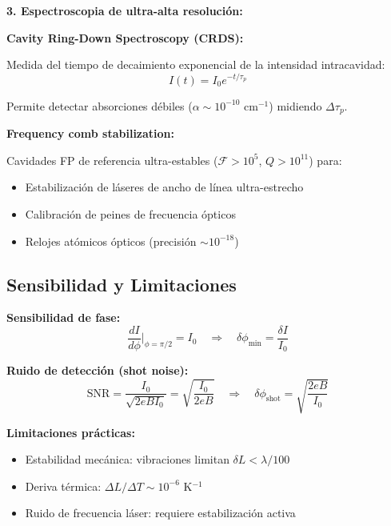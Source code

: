 \documentclass[11pt,a4paper]{article}
\begin{document}
\textbf{3. Espectroscopia de ultra-alta resolución:}

\textbf{Cavity Ring-Down Spectroscopy (CRDS):}

Medida del tiempo de decaimiento exponencial de la intensidad intracavidad:
\begin{equation}
    I(t) = I_0 e^{-t/\tau_p}
\end{equation}

Permite detectar absorciones débiles ($\alpha \sim 10^{-10}$ cm$^{-1}$) midiendo $\Delta\tau_p$.

\textbf{Frequency comb stabilization:}

Cavidades FP de referencia ultra-estables ($\mathcal{F} > 10^5$, $Q > 10^{11}$) para:
\begin{itemize}
    \item Estabilización de láseres de ancho de línea ultra-estrecho
    \item Calibración de peines de frecuencia ópticos
    \item Relojes atómicos ópticos (precisión $\sim 10^{-18}$)
\end{itemize}

\subsection{Sensibilidad y Limitaciones}

\textbf{Sensibilidad de fase:}
\begin{equation}
    \frac{dI}{d\phi} \bigg|_{\phi=\pi/2} = I_0 \quad \Rightarrow \quad \delta\phi_{\text{min}} = \frac{\delta I}{I_0}
\end{equation}

\textbf{Ruido de detección (shot noise):}
\begin{equation}
    \text{SNR} = \frac{I_0}{\sqrt{2eBI_0}} = \sqrt{\frac{I_0}{2eB}} \quad \Rightarrow \quad \delta\phi_{\text{shot}} = \sqrt{\frac{2eB}{I_0}}
\end{equation}

\textbf{Limitaciones prácticas:}
\begin{itemize}
    \item Estabilidad mecánica: vibraciones limitan $\delta L < \lambda/100$
    \item Deriva térmica: $\Delta L/\Delta T \sim 10^{-6}$ K$^{-1}$
    \item Ruido de frecuencia láser: requiere estabilización activa
\end{itemize}

\end{document}
